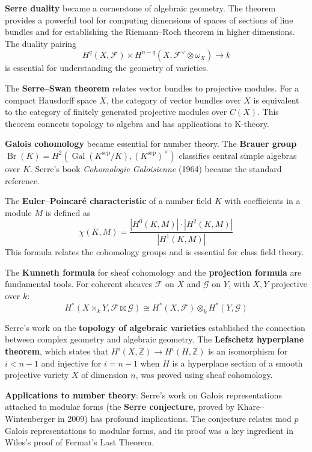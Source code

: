 \textbf{Serre duality} became a cornerstone of algebraic geometry. The theorem provides a powerful tool for computing dimensions of spaces of sections of line bundles and for establishing the Riemann--Roch theorem in higher dimensions. The duality pairing
\[H^q(X, \mathcal{F}) \times H^{n-q}(X, \mathcal{F}^\vee \otimes \omega_X) \to k\]
is essential for understanding the geometry of varieties.

The \textbf{Serre--Swan theorem} relates vector bundles to projective modules. For a compact Hausdorff space $X$, the category of vector bundles over $X$ is equivalent to the category of finitely generated projective modules over $C(X)$. This theorem connects topology to algebra and has applications to K-theory.

\textbf{Galois cohomology} became essential for number theory. The \textbf{Brauer group} $\operatorname{Br}(K) = H^2(\operatorname{Gal}(K^{\text{sep}}/K), (K^{\text{sep}})^\times)$ classifies central simple algebras over $K$. Serre's book \emph{Cohomologie Galoisienne} (1964) became the standard reference.

The \textbf{Euler--Poincaré characteristic} of a number field $K$ with coefficients in a module $M$ is defined as
\[\chi(K, M) = \frac{|H^0(K, M)| \cdot |H^2(K, M)|}{|H^1(K, M)|}\]
This formula relates the cohomology groups and is essential for class field theory.

The \textbf{Kunneth formula} for sheaf cohomology and the \textbf{projection formula} are fundamental tools. For coherent sheaves $\mathcal{F}$ on $X$ and $\mathcal{G}$ on $Y$, with $X, Y$ projective over $k$:
\[H^*(X \times_k Y, \mathcal{F} \boxtimes \mathcal{G}) \cong H^*(X, \mathcal{F}) \otimes_k H^*(Y, \mathcal{G})\]

Serre's work on the \textbf{topology of algebraic varieties} established the connection between complex geometry and algebraic geometry. The \textbf{Lefschetz hyperplane theorem}, which states that $H^i(X, \mathbb{Z}) \to H^i(H, \mathbb{Z})$ is an isomorphism for $i < n-1$ and injective for $i = n-1$ when $H$ is a hyperplane section of a smooth projective variety $X$ of dimension $n$, was proved using sheaf cohomology.

\textbf{Applications to number theory}: Serre's work on Galois representations attached to modular forms (the \textbf{Serre conjecture}, proved by Khare--Wintenberger in 2009) has profound implications. The conjecture relates mod $p$ Galois representations to modular forms, and its proof was a key ingredient in Wiles's proof of Fermat's Last Theorem.

